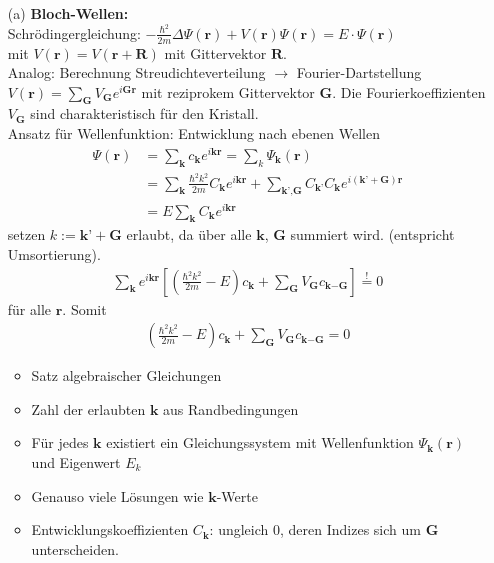\begin{itemize}
    \item[(a)] \textbf{Bloch-Wellen:}\\
    Schrödingergleichung: $-\frac{\hbar^2}{2m} \Delta \Psi(\textbf{r}) + V(\textbf{r}) \Psi(\textbf{r}) = E \cdot \Psi(\textbf{r})$\\
    mit $V(\textbf{r}) = V(\textbf{r} + \textbf{R})$ mit Gittervektor $\textbf{R}$.\\
    Analog: Berechnung Streudichteverteilung $\rightarrow$ Fourier-Dartstellung $V(\textbf{r}) = \sum_{\textbf{G}} V_{\textbf{G}} e^{i \textbf{G} \textbf{r}}$ mit reziprokem Gittervektor $ \textbf{G}$. Die Fourierkoeffizienten $V_{\textbf{G}}$ sind charakteristisch für den Kristall. \\
    Ansatz für Wellenfunktion: Entwicklung nach ebenen Wellen
    \begin{align}
        \Psi(\textbf{r}) &= \sum_{\textbf{k}} c_{\textbf{k}} e^{i \textbf{k} \textbf{r}} = \sum_k \Psi_{\textbf{k}}(\textbf{r}) \\
        &=\sum_{\textbf{k}} \frac{\hbar^2 k^2}{2m} C_{\textbf{k}} e^{i \textbf{k} \textbf{r}} + \sum_{\textbf{k'},\textbf{G}} C_{\textbf{k'}} C_{\textbf{k}} e^{i (\textbf{k'} +\textbf{G}) \textbf{r}}\\
        &= E \sum_{\textbf{k}} C_{\textbf{k}} e^{i \textbf{k} \textbf{r}}
    \end{align}
    setzen $k := \textbf{k'} + \textbf{G} $ erlaubt, da über alle $\textbf{k}$, $\textbf{G}$ summiert wird. (entspricht Umsortierung).
    \begin{align}
        \sum_{\textbf{k}} e^{i \textbf{k} \textbf{r}} \left[\left(\frac{\hbar^2k^2}{2m} - E\right)c_{\textbf{k}} + \sum_{\textbf{G}} V_{\textbf{G}} c_{\textbf{k}-\textbf{G}}\right] \overset{!}{=} 0
    \end{align}
    für alle $\textbf{r}$. Somit
    \begin{align}
        \left(\frac{\hbar^2k^2}{2m} - E\right)c_{\textbf{k}} + \sum_{\textbf{G}} V_{\textbf{G}} c_{\textbf{k}-\textbf{G}} = 0
    \end{align}

    \begin{itemize}
        \item Satz algebraischer Gleichungen
        \item Zahl der erlaubten $\textbf{k}$ aus Randbedingungen
        \item Für jedes $\textbf{k}$ existiert ein Gleichungssystem mit Wellenfunktion $\Psi_{\textbf{k}}(\textbf{r})$ und Eigenwert $E_{k}$
        \item Genauso viele Lösungen wie $\textbf{k}$-Werte
        \item Entwicklungskoeffizienten $C_{\textbf{k}}$: ungleich 0, deren Indizes sich um $\textbf{G}$ unterscheiden.
    \end{itemize}


\end{itemize}
